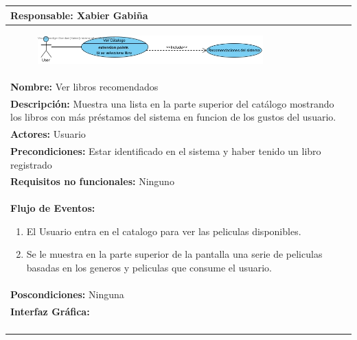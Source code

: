 \documentclass{report}
\begin{document}
            \begin{center}
                \begin{longtable}{|p{\linewidth}|}
                    \hline
                    \textbf{Responsable:} Xabier Gabiña\\
                    \hline
                    \begin{figure}[H]
                        \centering
                        \includegraphics[width=0.8\textwidth]{./img/casos_uso/RecomendacionesDelSistema.jpg}
                    \end{figure}\\
                    \hline
                    \textbf{Nombre:} Ver libros recomendados\\
                    \hline
                    \textbf{Descripción:} Muestra una lista en la parte superior del catálogo mostrando los libros con más préstamos del sistema en funcion de los gustos del usuario.\\
                    \hline
                    \textbf{Actores:} Usuario\\
                    \hline
                    \textbf{Precondiciones:} Estar identificado en el sistema y haber tenido un libro registrado\\
                    \hline
                    \textbf{Requisitos no funcionales:} Ninguno\\
                    \hline
                    \textbf{Flujo de Eventos:}
                    \begin{enumerate}
                        \item El Usuario entra en el catalogo para ver las peliculas disponibles.
                        \item Se le muestra en la parte superior de la pantalla una serie de peliculas basadas en los generos y peliculas que consume el usuario.
                    \end{enumerate}\\
                    \hline
                    \textbf{Poscondiciones:} Ninguna\\
                    \hline
                    \textbf{Interfaz Gráfica:}\\
                    \begin{figure}[H]
                        \centering

\end{figure}
\end{longtable}
\end{center}
\end{document}
